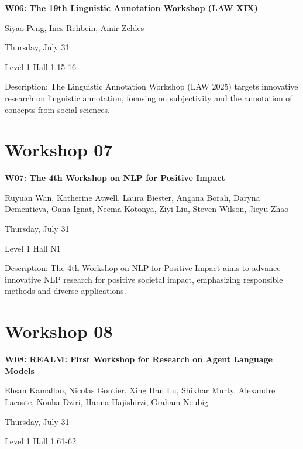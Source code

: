 \begin{center}
    {\Large \textbf{W06: The 19th Linguistic Annotation Workshop (LAW XIX)}}

    Siyao Peng, Ines Rehbein, Amir Zeldes

    Thursday, July 31
    
   Level 1 Hall 1.15-16

\end{center}

Description: The Linguistic Annotation Workshop (LAW 2025) targets innovative research on linguistic annotation, focusing on subjectivity and the annotation of concepts from social sciences.

\clearpage


\section[W07: The 4th Workshop on NLP for Positive Impact]{Workshop 07}

\begin{center}
    {\Large \textbf{W07: The 4th Workshop on NLP for Positive Impact}}

    Ruyuan Wan, Katherine Atwell, Laura Biester, Angana Borah, Daryna Dementieva, Oana Ignat, Neema Kotonya, Ziyi Liu, Steven Wilson, Jieyu Zhao

   Thursday, July 31
    
    Level 1 Hall N1

\end{center}

Description: The 4th Workshop on NLP for Positive Impact aims to advance innovative NLP research for positive societal impact, emphasizing responsible methods and diverse applications.


\clearpage



\section[W08: REALM: First Workshop for Research on Agent Language Models]{Workshop 08}

\begin{center}
    {\Large \textbf{W08: REALM: First Workshop for Research on Agent Language Models}}

    Ehsan Kamalloo, Nicolas Gontier, Xing Han Lu, Shikhar Murty, Alexandre Lacoste, Nouha Dziri, Hanna Hajishirzi, Graham Neubig

    Thursday, July 31
    
    Level 1 Hall 1.61-62

\end{center}

